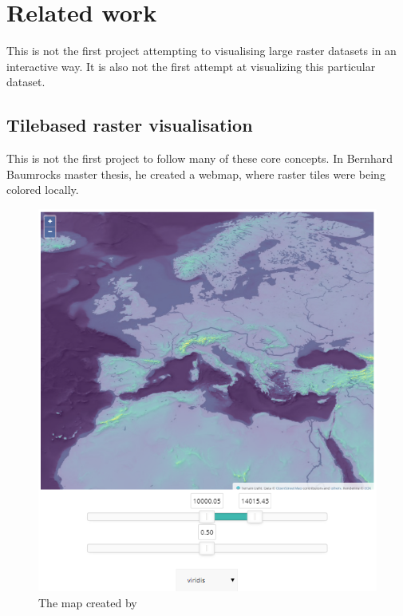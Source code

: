 \chapter{Related work}

This is not the first project attempting to visualising large raster datasets in an interactive way. It is also not the first attempt at visualizing this particular dataset. 


\section{Tilebased raster visualisation}

This is not the first project to follow many of these core concepts. In Bernhard Baumrocks master thesis, he created a webmap, where raster tiles were being colored locally. \citep{Baumrocks}

\begin{figure} [H]
	\centering
	\includegraphics[width=.8\textwidth]{Pictures/BaumrockMap1}
	\caption{The map created by \citep{EOX}}
	\label{BaumrockMap1}
\end{figure}

